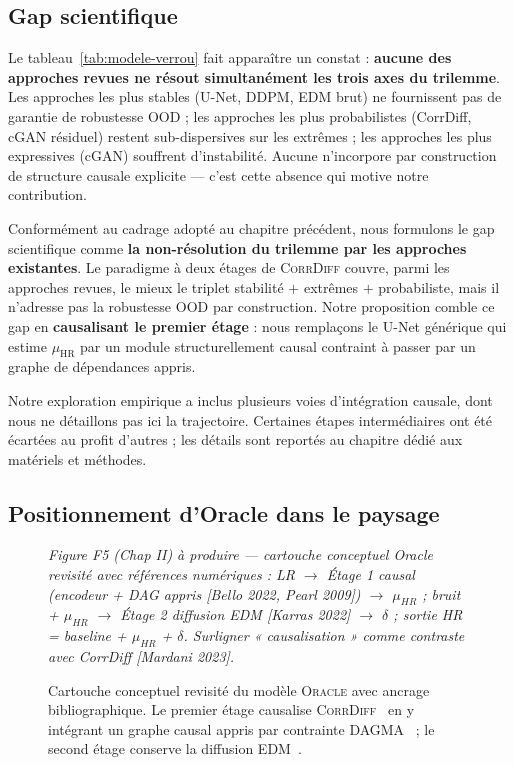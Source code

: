\documentclass[14pt,a4paper,openany]{extreport}
\theoremstyle{definition}
\newcommand{\Oracle}{\textsc{Oracle}}
\newcommand{\CorrDiff}{\textsc{CorrDiff}}
\newcommand{\HR}{\ensuremath{\text{HR}}}
\newcommand{\muHR}{\ensuremath{\mu_{\HR}}}
\newcommand{\figplaceholder}[2][0.9\linewidth]{%
  \begin{tcolorbox}[width=#1,height=5cm,valign=center,colback=gray!8,colframe=gray!45,arc=2pt,boxrule=0.5pt]
    \centering\small\textit{#2}
  \end{tcolorbox}%
}
\begin{document}
\subsection{Gap scientifique}
\label{ssec:soa-gap}

Le tableau~\ref{tab:modele-verrou} fait apparaître un constat : \textbf{aucune des approches revues ne résout simultanément les trois axes du trilemme}. Les approches les plus stables (U-Net, DDPM, EDM brut) ne fournissent pas de garantie de robustesse OOD ; les approches les plus probabilistes (CorrDiff, cGAN résiduel) restent sub-dispersives sur les extrêmes ; les approches les plus expressives (cGAN) souffrent d'instabilité. Aucune n'incorpore par construction de structure causale explicite --- c'est cette absence qui motive notre contribution.

Conformément au cadrage adopté au chapitre précédent, nous formulons le gap scientifique comme \textbf{la non-résolution du trilemme par les approches existantes}. Le paradigme à deux étages de \CorrDiff{} couvre, parmi les approches revues, le mieux le triplet stabilité $+$ extrêmes $+$ probabiliste, mais il n'adresse pas la robustesse OOD par construction. Notre proposition comble ce gap en \textbf{causalisant le premier étage} : nous remplaçons le U-Net générique qui estime $\muHR$ par un module structurellement causal contraint à passer par un graphe de dépendances appris.

Notre exploration empirique a inclus plusieurs voies d'intégration causale, dont nous ne détaillons pas ici la trajectoire. Certaines étapes intermédiaires ont été écartées au profit d'autres ; les détails sont reportés au chapitre dédié aux matériels et méthodes.

\subsection{Positionnement d'Oracle dans le paysage}
\label{ssec:soa-oracle-position}

\begin{figure}[ht]
  \centering
  \figplaceholder{Figure F5 (Chap II) à produire --- cartouche conceptuel Oracle revisité avec références numériques : LR $\to$ Étage 1 causal (encodeur + DAG appris [Bello 2022, Pearl 2009]) $\to$ $\mu_{HR}$ ; bruit + $\mu_{HR}$ $\to$ Étage 2 diffusion EDM [Karras 2022] $\to$ $\delta$ ; sortie HR = baseline + $\mu_{HR}$ + $\delta$. Surligner « causalisation » comme contraste avec CorrDiff [Mardani 2023].}
  \caption{Cartouche conceptuel revisité du modèle \Oracle{} avec ancrage bibliographique. Le premier étage causalise \CorrDiff{}~\cite{mardani_corrdiff_2023} en y intégrant un graphe causal appris par contrainte DAGMA~\cite{bello_dagma_2022} ; le second étage conserve la diffusion EDM~\cite{karras_edm_2022}.}
  \label{fig:oracle-revisite}
\end{figure}
\end{document}
